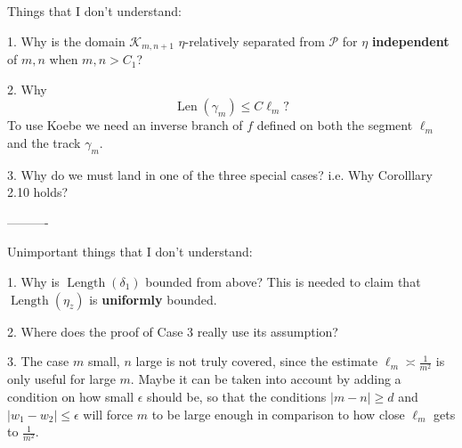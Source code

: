 Things that I don't understand:

1. Why is the domain $\mathcal K_{m,n+1}$ $\eta$-relatively separated from $\mathcal P$ for $\eta$ \textbf{independent} of $m,n$ when $m,n>C_1$?

2. Why $$\operatorname{Len}(\gamma_m) \leq C \ell_m?$$
To use Koebe we need an inverse branch of $f$ defined on both the segment $\ell_m$ and the track $\gamma_m$.

3. Why do we must land in one of the three special cases?
i.e. Why Corolllary 2.10 holds?




----------

Unimportant things that I don't understand:

1. Why is $\operatorname{Length}(\delta_1)$ bounded from above? This is needed to claim that $\operatorname{Length}(\eta_z)$ is \textbf{uniformly} bounded.

2. Where does the proof of Case 3 really use its assumption?

3. The case $m$ small, $n$ large is not truly covered, since the estimate $\ell_m \asymp \frac 1{m^2}$ is only useful for large $m$. 
Maybe it can be taken into account by adding a condition on how small $\epsilon$ should be, so that the conditions $|m-n| \geq d$ and $|w_1-w_2| \leq \epsilon$ will force $m$ to be large enough in comparison to how close $\ell _m$ gets to $\frac 1{m^2}$.





